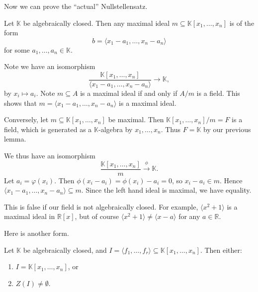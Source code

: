 \documentclass[12pt]{article}
\begin{document}

Now we can prove the ``actual'' Nullstellensatz.
\begin{theorem}[Nullstellensatz I]
	Let $\mathbb{K}$ be algebraically closed. Then any maximal ideal $m \subseteq \mathbb{K}[x_1, \ldots, x_n]$ is of the form
	\[
		b = \langle x_1 - a_1, \ldots, x_n - a_n \rangle
	\]
	for some $a_1, \ldots, a_n \in \mathbb{K}$.
\end{theorem}

\begin{proofbox}
	Note we have an isomorphism
	\[
		\frac{\mathbb{K}[x_1, \ldots, x_n]}{\langle x_1 - a_1, \ldots, x_n - a_n \rangle} \to \mathbb{K},
	\]
	by $x_i \mapsto a_i$. Note $m \subseteq A$ is a maximal ideal if and only if $A / m$ is a field. This shows that $m = \langle x_1 - a_1, \ldots, x_n - a_n\rangle$ is a maximal ideal.

	Conversely, let $m \subseteq \mathbb{K}[x_1, \ldots, x_n]$ be maximal. Then $\mathbb{K}[x_1, \ldots, x_n] / m = F$ is a field, which is generated as a $\mathbb{K}$-algebra by $x_1, \ldots, x_n$. Thus $F = \mathbb{K}$ by our previous lemma.

	We thus have an isomorphism
	\[
		\frac{\mathbb{K}[x_1, \ldots, x_n]}{m} \overset{\phi}{\to} \mathbb{K}.
	\]
	Let $a_i = \varphi(x_i)$. Then $\phi(x_i - a_i) = \phi(x_i) - a_i = 0$, so $x_i - a_i \in m$. Hence $\langle x_1 - a_1, \ldots, x_n - a_n \rangle \subseteq m$. Since the left hand ideal is maximal, we have equality.
\end{proofbox}

\begin{exbox}
	This is false if our field is not algebraically closed. For example, $\langle x^2 + 1 \rangle$ is a maximal ideal in $\mathbb{R}[x]$, but of course $\langle x^2 + 1 \rangle \neq \langle x - a \rangle$ for any $a \in \mathbb{R}$.
\end{exbox}

Here is another form.

\begin{theorem}[Nullstellensatz II]
	Let $\mathbb{K}$ be algebraically closed, and $I = \langle f_1, \ldots, f_r \rangle \subseteq \mathbb{K}[x_1, \ldots, x_n]$. Then either:
	\begin{enumerate}[\normalfont1.]
		\item $I = \mathbb{K}[x_1, \ldots, x_n]$, or
		\item $Z(I) \neq \emptyset$.
	\end{enumerate}
\end{theorem}
\end{document}
